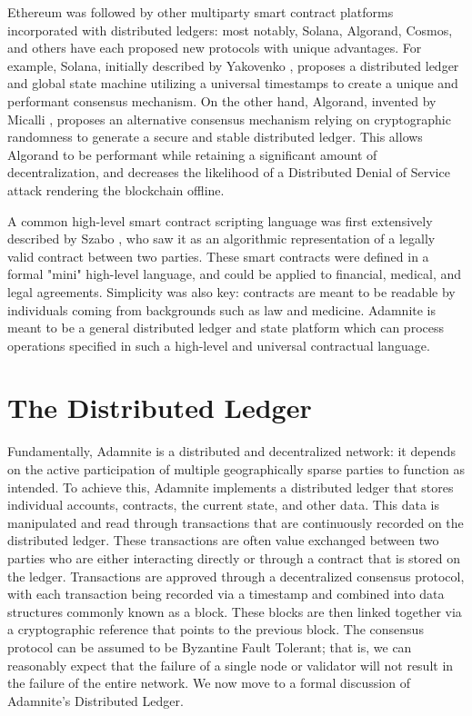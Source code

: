 \documentclass[conference]{IEEEtran}
\begin{document}
Ethereum was followed by other multiparty smart contract platforms incorporated with distributed ledgers: most notably, Solana, Algorand, Cosmos, and others have each proposed new protocols with unique advantages. For example, Solana, initially described by Yakovenko \cite {Yakovenko}, proposes a distributed ledger and global state machine utilizing a universal timestamps to create a unique and performant consensus mechanism. On the other hand, Algorand, invented by
Micalli \cite{micalli2017Algroand}, proposes an alternative consensus mechanism relying on cryptographic randomness to generate a secure and stable distributed ledger. This allows Algorand to be performant while retaining a significant amount of decentralization, and decreases the likelihood of a Distributed Denial of Service attack rendering the blockchain offline.

A common high-level smart contract scripting language was first extensively described by Szabo \cite{szaboContract}, who saw it as an algorithmic representation of a legally valid contract between two parties. These smart contracts were defined in a formal "mini" high-level language, and could be applied to financial, medical, and legal agreements. Simplicity was also key: contracts are meant to be readable by individuals coming from backgrounds such as law and medicine. Adamnite is meant to be a general distributed ledger and state platform which can process operations specified in such a high-level and universal contractual language.


\section{The Distributed Ledger}
Fundamentally, Adamnite is a distributed and decentralized network: it depends on the active participation of multiple geographically sparse parties to function as intended. To achieve this, Adamnite implements a distributed ledger that stores individual accounts, contracts, the current state, and other data. This data is manipulated and read through transactions that are continuously recorded on the distributed ledger. These transactions are often value exchanged between two parties who are either interacting directly or through a contract that is stored on the ledger. Transactions are approved through a decentralized consensus protocol, with each transaction being recorded via a timestamp and combined into data structures commonly known as a block. These blocks are then linked together via a cryptographic reference that points to the previous block.  The consensus protocol can be assumed to be Byzantine Fault Tolerant; that is, we can reasonably expect that the failure of a single node or validator will not result in the failure of the entire network. We now move to a formal discussion of Adamnite's Distributed Ledger.
\end{document}
